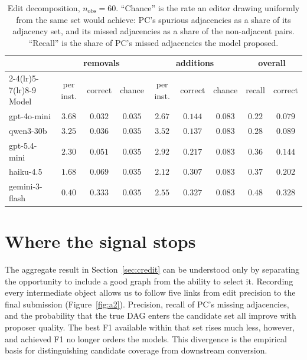 \documentclass{article}
\begin{document}
\begin{table}[h]
\caption{Edit decomposition, $n_{\mathrm{obs}}{=}60$. ``Chance'' is the rate an editor drawing
uniformly from the same set would achieve: PC's spurious adjacencies as a share of its adjacency
set, and its missed adjacencies as a share of the non-adjacent pairs. ``Recall'' is the share of
PC's missed adjacencies the model proposed.}
\label{tab:decomp}
\centering
\small
\setlength{\tabcolsep}{4.5pt}
\begin{tabular}{lcccccccc}
\toprule
& \multicolumn{3}{c}{removals} & \multicolumn{3}{c}{additions} & \multicolumn{2}{c}{overall} \\
\cmidrule(lr){2-4}\cmidrule(lr){5-7}\cmidrule(lr){8-9}
Model & per inst. & correct & chance & per inst. & correct & chance & recall & correct \\
\midrule
gpt-4o-mini    & $3.68$ & $0.032$ & $0.035$ & $2.67$ & $0.144$ & $0.083$ & $0.22$ & $0.079$ \\
qwen3-30b      & $3.25$ & $0.036$ & $0.035$ & $3.52$ & $0.137$ & $0.083$ & $0.28$ & $0.089$ \\
gpt-5.4-mini   & $2.30$ & $0.051$ & $0.035$ & $2.92$ & $0.217$ & $0.083$ & $0.36$ & $0.144$ \\
haiku-4.5      & $1.68$ & $0.069$ & $0.035$ & $2.12$ & $0.307$ & $0.083$ & $0.37$ & $0.202$ \\
gemini-3-flash & $0.40$ & $0.333$ & $0.035$ & $2.55$ & $0.327$ & $0.083$ & $0.48$ & $0.328$ \\
\bottomrule
\end{tabular}
\end{table}

\section{Where the signal stops}
\label{app:chain}

The aggregate result in Section~\ref{sec:credit} can be understood only by separating the opportunity
to include a good graph from the ability to select it. Recording every intermediate object allows us
to follow five links from edit precision to the final submission (Figure~\ref{fig:a2}). Precision,
recall of PC's missing adjacencies, and the probability that the true DAG enters the candidate set all
improve with proposer quality. The best F1 available within that set rises much less, however, and
achieved F1 no longer orders the models. This divergence is the empirical basis for distinguishing
candidate coverage from downstream conversion.
\end{document}
